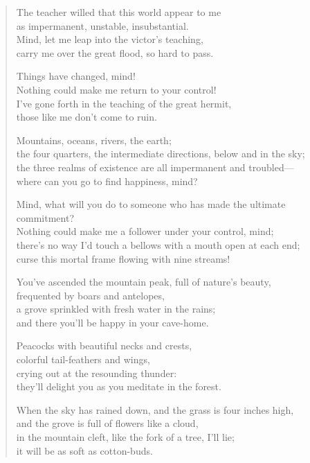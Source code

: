 \documentclass[12pt,openany]{book}%
\begin{document}
\begin{verse}
The teacher willed that this world appear to me \\
as impermanent, unstable, insubstantial. \\
Mind, let me leap into the victor’s teaching, \\
carry me over the great flood, so hard to pass. 

Things have changed, mind! \\
Nothing could make me return to your control! \\
I’ve gone forth in the teaching of the great hermit, \\
those like me don’t come to ruin. 

Mountains, oceans, rivers, the earth; \\
the four quarters, the intermediate directions, below and in the sky; \\
the three realms of existence are all impermanent and troubled—\\
where can you go to find happiness, mind? 

Mind, what will you do to someone who has made the ultimate commitment? \\
Nothing could make me a follower under your control, mind; \\
there’s no way I’d touch a bellows with a mouth open at each end; \\
curse this mortal frame flowing with nine streams! 

You’ve ascended the mountain peak, full of nature’s beauty, \\
frequented by boars and antelopes, \\
a grove sprinkled with fresh water in the rains; \\
and there you’ll be happy in your cave-home. 

Peacocks with beautiful necks and crests, \\
colorful tail-feathers and wings, \\
crying out at the resounding thunder: \\
they’ll delight you as you meditate in the forest. 

When the sky has rained down, and the grass is four inches high, \\
and the grove is full of flowers like a cloud, \\
in the mountain cleft, like the fork of a tree, I’ll lie; \\
it will be as soft as cotton-buds. 


\end{verse}
\end{document}
